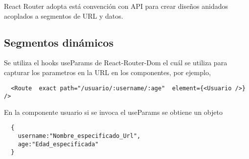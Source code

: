 React Router adopta est\'a convenci\'on con API para crear dise\~nos anidados acoplados a segmentos de URL y datos.


\subsection{Segmentos din\'amicos}

Se utiliza el hooks useParams de React-Router-Dom el cu\'al se utiliza para capturar los parametros en la URL en los componentes,
por ejemplo,
\begin{verbatim}
  <Route  exact path="/usuario/:username/:age"  element={<Usuario />} />
\end{verbatim}
En la componente usuario si se invoca el useParams se obtiene un objeto
\begin{verbatim}
  {
    username:"Nombre_especificado_Url",
    age:"Edad_especificada"
  }
\end{verbatim}